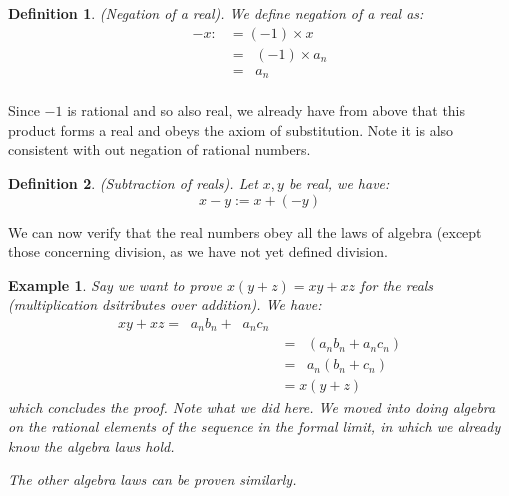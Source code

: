 \documentclass{article}
\newtheorem{example}{Example}[subsection]
\newtheorem{definition}{Definition}[subsection]
\DeclareMathOperator{\infLIM}{\mathrm{LIM}_{n \to \infty}}
\let\it\textit
\begin{document}
\begin{definition}
	(Negation of a real). We define negation of 
	a real as:
	\begin{align*}
		-x :&= (-1) \times x \\ 
		    &= \infLIM (-1) \times a_n \\
		    &= \infLIM a_n \\
	\end{align*}
\end{definition}

Since $-1$ is rational and so also real, we already have 
from above that this product forms a real and obeys
the axiom of substitution. Note it is also consistent 
with out negation of rational numbers.

\begin{definition}
	(Subtraction of reals). Let $x,y$ be real, we have: 
	$$
	x - y := x + (-y)
	$$
\end{definition}

We can now verify that the real numbers obey all the laws 
of algebra (except those concerning division, as  we
have not yet defined division.

\begin{example}
	Say we want to prove $x(y+z) = xy + xz$ for the reals 
	(multiplication dsitributes over addition). We have:
	\begin{align*}
		xy + xz = \infLIM a_n b_n + \infLIM a_n c_n \\
		&= \infLIM (a_n b_n + a_n c_n) \\
		&= \infLIM a_n (b_n + c_n) \\
		&= x(y+z)
	\end{align*}
	which concludes the proof. Note what we did here.
	We moved into doing algebra on the \it{rational 
	elements of the sequence in the formal limit,
	in which we already know the algebra laws hold.}

	The other algebra laws can be proven similarly.
\end{example}
\end{document}
